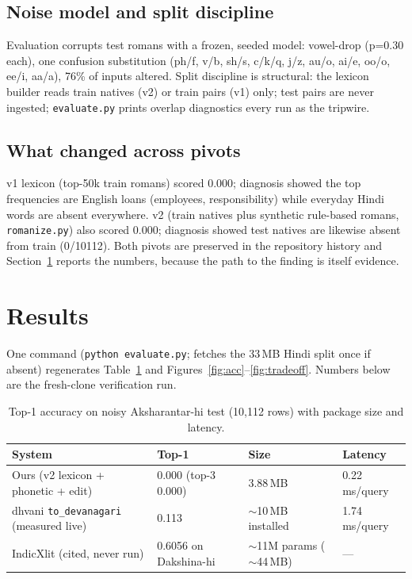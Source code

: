 \documentclass[11pt,a4paper]{article}
\begin{document}
\subsection{Noise model and split discipline}

Evaluation corrupts test romans with a frozen, seeded model: vowel-drop (p=0.30 each), one confusion substitution (ph/f, v/b, sh/s, c/k/q, j/z, au/o, ai/e, oo/o, ee/i, aa/a), 76\% of inputs altered. Split discipline is structural: the lexicon builder reads train natives (v2) or train pairs (v1) only; test pairs are never ingested; \verb!evaluate.py! prints overlap diagnostics every run as the tripwire.

\subsection{What changed across pivots}

v1 lexicon (top-50k train romans) scored 0.000; diagnosis showed the top frequencies are English loans (employees, responsibility) while everyday Hindi words are absent everywhere. v2 (train natives plus synthetic rule-based romans, \verb!romanize.py!) also scored 0.000; diagnosis showed test natives are likewise absent from train (0/10112). Both pivots are preserved in the repository history and Section~\ref{sec:results} reports the numbers, because the path to the finding is itself evidence.

\section{Results}
\label{sec:results}

One command (\verb!python evaluate.py!; fetches the 33\,MB Hindi split once if absent) regenerates Table~\ref{tab:results} and Figures~\ref{fig:acc}--\ref{fig:tradeoff}. Numbers below are the fresh-clone verification run.

\begin{table}[H]
\centering
\caption{Top-1 accuracy on noisy Aksharantar-hi test (10,112 rows) with package size and latency.}
\label{tab:results}
\begin{tabular}{@{}llll@{}}
\toprule
System & Top-1 & Size & Latency \\
\midrule
Ours (v2 lexicon + phonetic + edit) & 0.000 (top-3 0.000) & 3.88\,MB & 0.22\,ms/query \\
dhvani \verb!to_devanagari! (measured live) & 0.113 & $\sim$10\,MB installed & 1.74\,ms/query \\
IndicXlit (cited, never run) & 0.6056 on Dakshina-hi & $\sim$11M params ($\sim$44\,MB) & --- \\
\bottomrule
\end{tabular}
\end{table}
\end{document}
